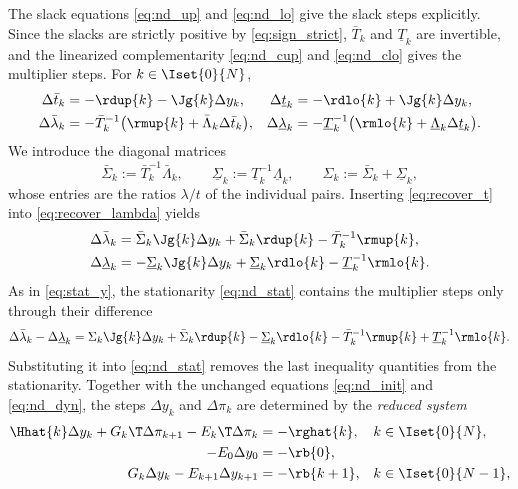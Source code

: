 The slack equations \eqref{eq:nd_up} and \eqref{eq:nd_lo} give the slack steps explicitly.
Since the slacks are strictly positive by \eqref{eq:sign_strict}, $\bar{T}_k$ and $\underline{T}_k$ are invertible, and the linearized complementarity \eqref{eq:nd_cup} and \eqref{eq:nd_clo} gives the multiplier steps.
For $k\in\Iset{0}{N}$,
\begin{subequations} \label{eq:recover}
\begin{align}
    \Delta\bar{t}_k &= -\rdup{k} - \Jg{k}\Delta y_k , &
    \Delta\underline{t}_k &= -\rdlo{k} + \Jg{k}\Delta y_k , \label{eq:recover_t}\\
    \Delta\bar{\lambda}_k &= -\bar{T}_k^{-1}\big(\rmup{k} + \bar{\Lambda}_k\Delta\bar{t}_k\big) , &
    \Delta\underline{\lambda}_k &= -\underline{T}_k^{-1}\big(\rmlo{k} + \underline{\Lambda}_k\Delta\underline{t}_k\big) . \label{eq:recover_lambda}
\end{align}
\end{subequations}
We introduce the diagonal matrices
\[
    \bar{\Sigma}_k := \bar{T}_k^{-1}\bar{\Lambda}_k ,
    \qquad
    \underline{\Sigma}_k := \underline{T}_k^{-1}\underline{\Lambda}_k ,
    \qquad
    \Sigma_k := \bar{\Sigma}_k + \underline{\Sigma}_k ,
\]
whose entries are the ratios $\lambda / t$ of the individual pairs.
Inserting \eqref{eq:recover_t} into \eqref{eq:recover_lambda} yields
\begin{align*}
    \Delta\bar{\lambda}_k &= \bar{\Sigma}_k\Jg{k}\Delta y_k + \bar{\Sigma}_k\rdup{k} - \bar{T}_k^{-1}\rmup{k} , \\
    \Delta\underline{\lambda}_k &= -\underline{\Sigma}_k\Jg{k}\Delta y_k + \underline{\Sigma}_k\rdlo{k} - \underline{T}_k^{-1}\rmlo{k} .
\end{align*}
As in \eqref{eq:stat_y}, the stationarity \eqref{eq:nd_stat} contains the multiplier steps only through their difference
\[
    \Delta\bar{\lambda}_k - \Delta\underline{\lambda}_k
    = \Sigma_k\Jg{k}\Delta y_k + \bar{\Sigma}_k\rdup{k} - \underline{\Sigma}_k\rdlo{k} - \bar{T}_k^{-1}\rmup{k} + \underline{T}_k^{-1}\rmlo{k} .
\]
Substituting it into \eqref{eq:nd_stat} removes the last inequality quantities from the stationarity.
Together with the unchanged equations \eqref{eq:nd_init} and \eqref{eq:nd_dyn}, the steps $\Delta y_k$ and $\Delta\pi_k$ are determined by the \textit{reduced system}
\begin{subequations} \label{eq:newton_reduced}
\begin{align}
    \Hhat{k}\Delta y_k + G_k\T\Delta\pi_{k+1} - E_k\T\Delta\pi_k &= -\rghat{k} , && k\in\Iset{0}{N}, \label{eq:nr_stat}\\
    -E_0\Delta y_0 &= -\rb{0} , && \label{eq:nr_init}\\
    G_k\Delta y_k - E_{k+1}\Delta y_{k+1} &= -\rb{k+1} , && k\in\Iset{0}{N-1}, \label{eq:nr_dyn}
\end{align}
\end{subequations}
